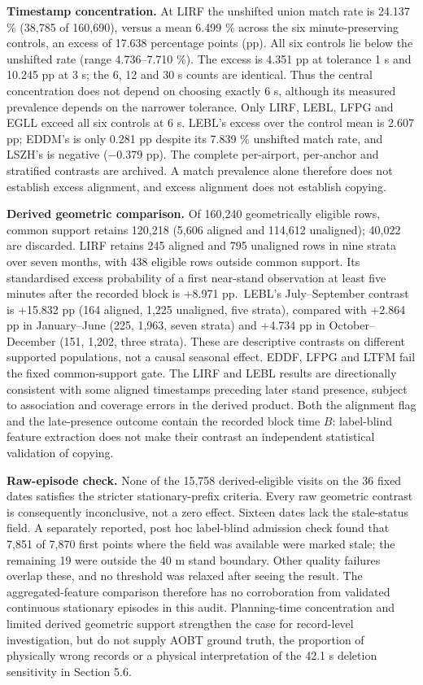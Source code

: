 \documentclass[11pt,a4paper]{article}
\begin{document}
\textbf{Timestamp concentration.} At LIRF the unshifted union match rate is 24.137 \% (38,785 of 160,690), versus a mean 6.499 \% across the six minute-preserving controls, an excess of 17.638 percentage points (pp). All six controls lie below the unshifted rate (range 4.736--7.710 \%). The excess is 4.351 pp at tolerance 1 s and 10.245 pp at 3 s; the 6, 12 and 30 s counts are identical. Thus the central concentration does not depend on choosing exactly 6 s, although its measured prevalence depends on the narrower tolerance. Only LIRF, LEBL, LFPG and EGLL exceed all six controls at 6 s. LEBL's excess over the control mean is 2.607 pp; EDDM's is only 0.281 pp despite its 7.839 \% unshifted match rate, and LSZH's is negative ($-$0.379 pp). The complete per-airport, per-anchor and stratified contrasts are archived. A match prevalence alone therefore does not establish excess alignment, and excess alignment does not establish copying.

\textbf{Derived geometric comparison.} Of 160,240 geometrically eligible rows, common support retains 120,218 (5,606 aligned and 114,612 unaligned); 40,022 are discarded. LIRF retains 245 aligned and 795 unaligned rows in nine strata over seven months, with 438 eligible rows outside common support. Its standardised excess probability of a first near-stand observation at least five minutes after the recorded block is +8.971 pp.~LEBL's July--September contrast is +15.832 pp (164 aligned, 1,225 unaligned, five strata), compared with +2.864 pp in January--June (225, 1,963, seven strata) and +4.734 pp in October--December (151, 1,202, three strata). These are descriptive contrasts on different supported populations, not a causal seasonal effect. EDDF, LFPG and LTFM fail the fixed common-support gate. The LIRF and LEBL results are directionally consistent with some aligned timestamps preceding later stand presence, subject to association and coverage errors in the derived product. Both the alignment flag and the late-presence outcome contain the recorded block time \(B\): label-blind feature extraction does not make their contrast an independent statistical validation of copying.

\textbf{Raw-episode check.} None of the 15,758 derived-eligible visits on the 36 fixed dates satisfies the stricter stationary-prefix criteria. Every raw geometric contrast is consequently inconclusive, not a zero effect. Sixteen dates lack the stale-status field. A separately reported, post hoc label-blind admission check found that 7,851 of 7,870 first points where the field was available were marked stale; the remaining 19 were outside the 40 m stand boundary. Other quality failures overlap these, and no threshold was relaxed after seeing the result. The aggregated-feature comparison therefore has no corroboration from validated continuous stationary episodes in this audit. Planning-time concentration and limited derived geometric support strengthen the case for record-level investigation, but do not supply AOBT ground truth, the proportion of physically wrong records or a physical interpretation of the 42.1 s deletion sensitivity in Section 5.6.
\end{document}
